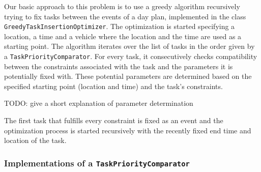 Our basic approach to this problem is to use a greedy algorithm recursively trying to fix tasks between the events of a day plan, implemented in the class \texttt{GreedyTaskInsertionOptimizer}. The optimization is started specifying a location, a time and a vehicle where the location and the time are used as a starting point. The algorithm iterates over the list of tasks in the order given by a \texttt{TaskPriorityComparator}. For every task, it consecutively checks compatibility between the constraints associated with the task and the parameters it is potentially fixed with. These potential parameters are determined based on the specified starting point (location and time) and the task's constraints.\newline

TODO: give a short explanation of parameter determination\newline

The first task that fulfills every constraint is fixed as an event and the optimization process is started recursively with the recently fixed end time and location of the task.

\subsubsection{Implementations of a \texttt{TaskPriorityComparator}}




